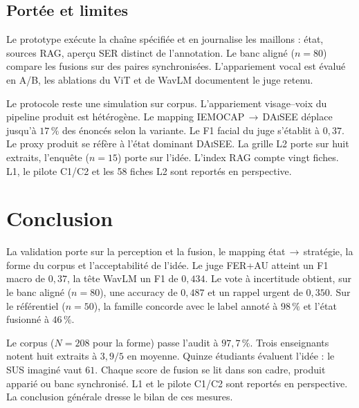 \subsection{Portée et limites}

Le prototype exécute la chaîne spécifiée et en journalise les maillons :
état, sources RAG, aperçu SER distinct de l'annotation. Le banc aligné
($n=80$) compare les fusions sur des paires synchronisées. L'appariement
vocal est évalué en A/B, les ablations du ViT et de WavLM documentent
le juge retenu.

Le protocole reste une simulation sur corpus. L'appariement
visage--voix du pipeline produit est hétérogène. Le mapping
\textsc{IEMOCAP}\,$\rightarrow$\,\textsc{DAiSEE} déplace jusqu'à
$17\,\%$ des énoncés selon la variante. Le F1 facial du juge s'établit
à $0{,}37$. Le proxy produit se réfère à l'état dominant
\textsc{DAiSEE}. La grille L2 porte sur huit extraits, l'enquête
($n=15$) porte sur l'idée. L'index RAG compte vingt fiches. L1, le
pilote C1/C2 et les 58 fiches L2 sont reportés en perspective.

\section{Conclusion}
\label{sec:ch5-concl}

La validation porte sur la perception et la fusion, le mapping
état\,$\rightarrow$\,stratégie, la forme du corpus et l'acceptabilité
de l'idée. Le juge FER+AU atteint un F1 macro de $0{,}37$, la tête
WavLM un F1 de $0{,}434$. Le vote à incertitude obtient, sur le banc
aligné ($n=80$), une accuracy de $0{,}487$ et un rappel urgent de
$0{,}350$. Sur le référentiel ($n=50$), la famille concorde avec le
label annoté à $98\,\%$ et l'état fusionné à $46\,\%$.

Le corpus ($N=208$ pour la forme) passe l'audit à $97{,}7\,\%$. Trois
enseignants notent huit extraits à $3{,}9/5$ en moyenne. Quinze
étudiants évaluent l'idée : le SUS imaginé vaut $61$. Chaque score de
fusion se lit dans son cadre, produit apparié ou banc synchronisé.
L1 et le pilote C1/C2 sont reportés en perspective. La conclusion
générale dresse le bilan de ces mesures.